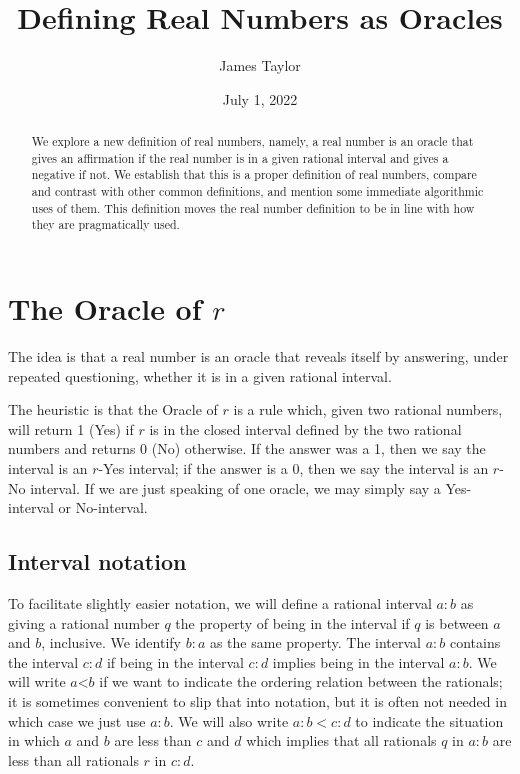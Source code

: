 \documentclass[12pt]{article}
\title{Defining Real Numbers as Oracles}
\author{
  James Taylor
}
\date{July 1, 2022}
\theoremstyle{remark}
\newcommand{\lt}{\mathord{<}}
\begin{document}
\maketitle
\begin{abstract}
We explore a new definition of real numbers, namely, a real number is an oracle that gives an affirmation if the real number is in a given rational interval and gives a negative if not. We establish that this is a proper definition of real numbers, compare and contrast with other common definitions, and mention some immediate algorithmic uses of them. This definition moves the real number definition to be in line with how they are pragmatically used. 
\end{abstract}

\tableofcontents

\section{The Oracle of $r$}\label{sec:ora}

The idea is that a real number is an oracle that reveals itself by answering, under repeated questioning, whether it is in a given rational interval. 

The heuristic is that the Oracle of $r$ is a rule which, given two rational numbers, will return 1 (Yes) if $r$ is in the closed interval defined by the two rational numbers and returns 0 (No) otherwise. If the answer was a 1, then we say the interval is an $r$-Yes interval; if the answer is a 0, then we say the interval is an $r$-No interval.  If we are just speaking of one oracle, we may simply say a Yes-interval or No-interval. 

\subsection{Interval notation}

To facilitate slightly easier notation, we will define a rational interval $a:b$ as giving a rational number $q$ the property of being in the interval if $q$ is between $a$ and $b$, inclusive. We identify $b:a$ as the same property. The interval $a:b$ contains the interval $c:d$ if being in the interval $c:d$ implies being in the interval $a:b$. We will write $a\lt b$ if we want to indicate the ordering relation between the rationals; it is sometimes convenient to slip that into notation, but it is often not needed in which case we just use $a:b$. We will also write $a:b < c:d$ to indicate the situation in which $a$ and $b$ are less than $c$ and $d$ which implies that all rationals $q$ in $a:b$ are less than all rationals $r$ in $c:d$.
\end{document}
